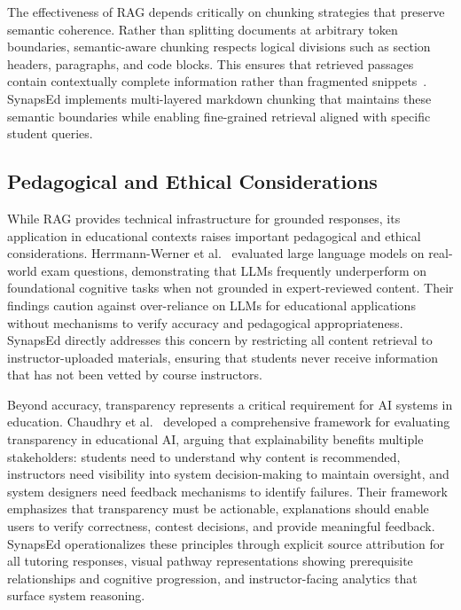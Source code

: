 \documentclass{stylefiles/capstone}
\begin{document}
The effectiveness of RAG depends critically on chunking strategies that preserve semantic coherence. Rather than splitting documents at arbitrary token boundaries, semantic-aware chunking respects logical divisions such as section headers, paragraphs, and code blocks. This ensures that retrieved passages contain contextually complete information rather than fragmented snippets~\cite{lewis2021rag}. SynapsEd implements multi-layered markdown chunking that maintains these semantic boundaries while enabling fine-grained retrieval aligned with specific student queries.

\subsection{Pedagogical and Ethical Considerations}

While RAG provides technical infrastructure for grounded responses, its application in educational contexts raises important pedagogical and ethical considerations. Herrmann-Werner et al.~\cite{Herrmann-Werner2024} evaluated large language models on real-world exam questions, demonstrating that LLMs frequently underperform on foundational cognitive tasks when not grounded in expert-reviewed content. Their findings caution against over-reliance on LLMs for educational applications without mechanisms to verify accuracy and pedagogical appropriateness. SynapsEd directly addresses this concern by restricting all content retrieval to instructor-uploaded materials, ensuring that students never receive information that has not been vetted by course instructors.

Beyond accuracy, transparency represents a critical requirement for AI systems in education. Chaudhry et al.~\cite{chaudhry2022transparencyindexframeworkai} developed a comprehensive framework for evaluating transparency in educational AI, arguing that explainability benefits multiple stakeholders: students need to understand why content is recommended, instructors need visibility into system decision-making to maintain oversight, and system designers need feedback mechanisms to identify failures. Their framework emphasizes that transparency must be actionable, explanations should enable users to verify correctness, contest decisions, and provide meaningful feedback. SynapsEd operationalizes these principles through explicit source attribution for all tutoring responses, visual pathway representations showing prerequisite relationships and cognitive progression, and instructor-facing analytics that surface system reasoning.
\end{document}
